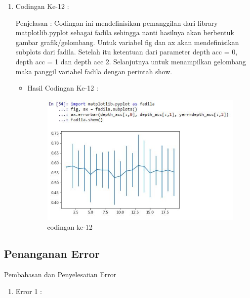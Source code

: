 \begin{enumerate}
\begin{enumerate}
\begin{enumerate}
\begin{itemize}
\end{itemize}
\par
\item Codingan Ke-12 :
\par Penjelasan : Codingan ini mendefinisikan pemanggilan dari library matplotlib.pyplot sebagai fadila sehingga nanti hasilnya akan berbentuk gambar grafik/gelombang. Untuk variabel fig dan ax akan mendefinisikan subplots dari fadila. Setelah itu ketentuan dari parameter depth acc = 0, depth acc = 1 dan depth acc 2. Selanjutnya untuk menampilkan gelombang maka panggil variabel fadila dengan perintah show.
\par 
\begin{itemize}
\par
\item Hasil Codingan Ke-12 :

\begin{figure}[ht]
\centering
\includegraphics[scale=0.4]{figures/hasil12.jpg}
\caption{codingan ke-12}
\label{contoh}
\end{figure}

\end{itemize}
\end{enumerate}
\end{enumerate}

\subsection{Penanganan Error}
\par Pembahasan dan Penyelesaiian Error
\par
\begin{enumerate}
\item Error 1	: 
\par
\par


\end{enumerate}
\end{enumerate}
